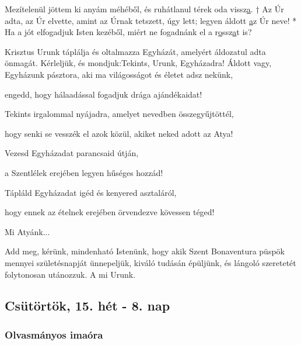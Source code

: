\documentclass[twoside]{article}
\begin{document}
Mezítelenül jöttem ki anyám méhéből, és ruhátlanul térek oda vissz\underline{a}. † Az Úr adta, az Úr elvette, amint az Úrnak tetszett, úgy lett; legyen áldott \underline{a}z Úr neve! * Ha a jót elfogadjuk Isten kezéből, miért ne fogadnánk el a r\underline{o}ssz\underline{a}t is?






\begin{preces}{Krisztus Urunk táplálja és oltalmazza Egyházát, amelyért áldozatul adta önmagát. Kérleljük, és mondjuk:}{Tekints, Urunk, Egyházadra!}
  Áldott vagy, Egyházunk pásztora, aki ma világosságot és életet adsz nekünk,

  \reddash engedd, hogy hálaadással fogadjuk drága ajándékaidat!

  Tekints irgalommal nyájadra, amelyet nevedben összegyűjtöttél,

  \reddash hogy senki se vesszék el azok közül, akiket neked adott az Atya!

  Vezesd Egyházadat parancsaid útján,

  \reddash a Szentlélek erejében legyen hűséges hozzád!

  Tápláld Egyházadat igéd és kenyered asztaláról,

  \reddash hogy ennek az ételnek erejében örvendezve kövessen téged!
\end{preces}
Mi Atyánk...

Add meg, kérünk, mindenható Istenünk, hogy akik Szent Bonaventura püspök mennyei születésnapját ünnepeljük, kiváló tudásán épüljünk, és lángoló szeretetét folytonosan utánozzuk. A mi Urunk.


\subsection*{Csütörtök, 15. hét - 8. nap}


\subsubsection*{Olvasmányos imaóra}
\end{document}
